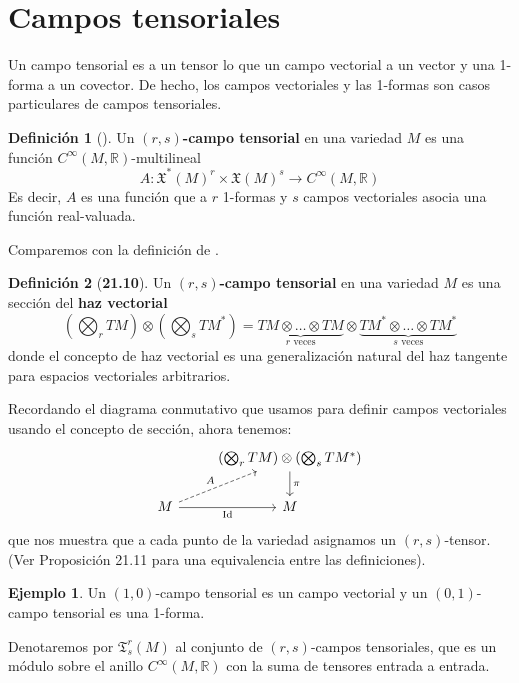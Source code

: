 \documentclass[spanish]{book}
\theoremstyle{definition}
\newtheorem*{defn}{Definición}
\newtheorem*{teo}{Teorema}
\newtheorem*{ejem}{Ejemplo}
\newcommand{\R}{\mathbb{R}}
\newcommand{\T}{\mathfrak{T}}
\newcommand{\Cinf}{C^\infty}
\DeclareMathOperator{\Id}{Id}
\begin{document}
	\section{Campos tensoriales}
	Un campo tensorial es a un tensor lo que un campo vectorial a un vector y una 1-forma a un covector. De hecho, los campos vectoriales y las 1-formas son casos particulares de campos tensoriales.
	\begin{defn}[\cite{ONeill}]\label{def:campo-tensorial}
		Un \textbf{$(r,s)$-campo tensorial} en una variedad $M$ es una función $\Cinf(M,\R)$-multilineal
		\[A:\mathfrak{X}^*(M)^r\times\mathfrak{X}(M)^s\to\Cinf(M,\R)\]
		Es decir, $A$ es una función que a $r$ 1-formas y $s$ campos vectoriales asocia una función real-valuada.
	\end{defn}
	
	Comparemos con la definición de \cite{Loring-dif}.
	\begin{defn}[\textbf{21.10}]
		Un $(r,s)$\textbf{-campo tensorial} en una variedad $M$ es una sección del \textbf{haz vectorial}
		\[\left(\bigotimes_rTM\right)\otimes\left(\bigotimes_sTM^*\right)=\underbrace{TM\otimes\ldots\otimes TM}_{r\text{ veces}}\otimes \underbrace{TM^*\otimes\ldots\otimes TM^*}_{s\text{ veces}}\]
		donde el concepto de haz vectorial es una generalización natural del haz tangente para espacios vectoriales arbitrarios.
	\end{defn}
	
	Recordando el diagrama conmutativo que usamos para definir campos vectoriales usando el concepto de sección, ahora tenemos:
	\[\begin{tikzcd}
		&\left(\bigotimes_rTM\right)\otimes\left(\bigotimes_sTM^*\right)\arrow{d}{\pi}\\
		M\arrow[dashed]{ur}{A}\arrow[swap]{r}{\Id}&M
	\end{tikzcd}\]
	que nos muestra que a cada punto de la variedad asignamos un $(r,s)$-tensor. (Ver Proposición 21.11 para una equivalencia entre las definiciones).
	
	\begin{ejem}
		Un $(1,0)$-campo tensorial es un campo vectorial y un $(0,1)$-campo tensorial es una 1-forma.
	\end{ejem}
	
	Denotaremos por $\T^r_s(M)$ al conjunto de $(r,s)$-campos tensoriales, que es un módulo sobre el anillo $\Cinf(M,\R)$ con la suma de tensores entrada a entrada.
	
	
\end{document}
